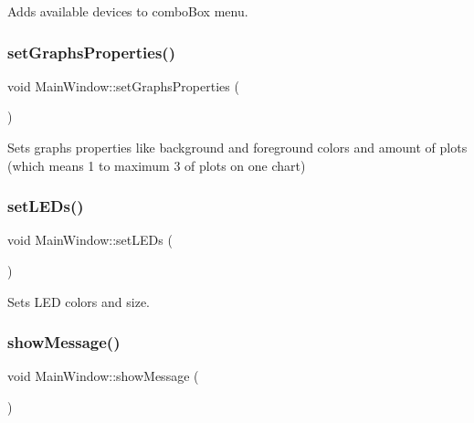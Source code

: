 Adds available devices to combo\+Box menu. 

\mbox{\label{class_main_window_a9a1bad7a80ca8e1c5075d80143957754}} 
\subsubsection{set\+Graphs\+Properties()}
{\footnotesize\ttfamily void Main\+Window\+::set\+Graphs\+Properties (\begin{DoxyParamCaption}{ }\end{DoxyParamCaption})\hspace{0.3cm}{\ttfamily [private]}}



Sets graphs properties like background and foreground colors and amount of plots (which means 1 to maximum 3 of plots on one chart) 

\mbox{\label{class_main_window_a33a37ae494ab281b466579ee54c6f642}} 
\subsubsection{set\+L\+E\+Ds()}
{\footnotesize\ttfamily void Main\+Window\+::set\+L\+E\+Ds (\begin{DoxyParamCaption}{ }\end{DoxyParamCaption})\hspace{0.3cm}{\ttfamily [private]}}



Sets L\+ED colors and size. 

\mbox{\label{class_main_window_a366da6a45407c523f570ca9e4f4b40a4}} 
\subsubsection{show\+Message()\hspace{0.1cm}{\footnotesize\ttfamily [1/2]}}
{\footnotesize\ttfamily void Main\+Window\+::show\+Message (\begin{DoxyParamCaption}{ }\end{DoxyParamCaption})\hspace{0.3cm}{\ttfamily [private]}}



